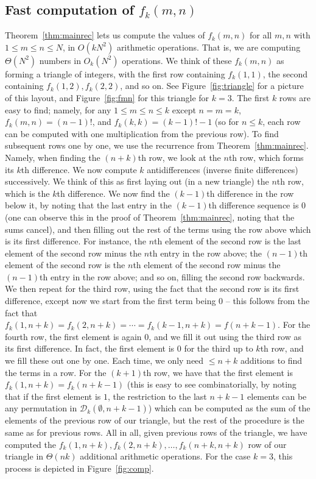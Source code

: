 \documentclass{amsart}
\theoremstyle{definition}
\begin{document}
\subsection{Fast computation of $f_k(m,n)$}\label{subsec:fast}
Theorem~\ref{thm:mainrec} lets us compute the values of $f_k(m,n)$ for all $m,n$ with $1\leq m\leq n\leq N$, in $O(k N^2)$ arithmetic operations. That is, we are computing $\Theta(N^2)$ numbers in $O_k(N^2)$ operations. We think of these $f_k(m,n)$ as forming a triangle of integers, with the first row containing $f_k(1,1)$, the second containing $f_k(1,2), f_k(2,2)$, and so on. See Figure~\ref{fig:triangle} for a picture of this layout, and Figure~\ref{fig:fmn} for this triangle for $k=3$. The first $k$ rows are easy to find; namely, for any $1\leq m\leq n\leq k$ except $n=m=k$, $f_k(m,n)=(n-1)!$, and $f_k(k,k)=(k-1)!-1$ (so for $n\leq k$, each row can be computed with one multiplication from the previous row). To find subsequent rows one by one, we use the recurrence from Theorem~\ref{thm:mainrec}. Namely, when finding the $(n+k)$th row, we look at the $n$th row, which forms its $k$th difference. We now compute $k$ antidifferences (inverse finite differences) successively. We think of this as first laying out (in a new triangle) the $n$th row, which is the $k$th difference. We now find the $(k-1)$th difference in the row below it, by noting that the last entry in the $(k-1)$th difference sequence is $0$ (one can observe this in the proof of Theorem~\ref{thm:mainrec}, noting that the sums cancel), and then filling out the rest of the terms using the row above which is its first difference. For instance, the $n$th element of the second row is the last element of the second row minus the $n$th entry in the row above; the $(n-1)$th element of the second row is the $n$th element of the second row minus the $(n-1)$th entry in the row above; and so on, filling the second row backwards. We then repeat for the third row, using the fact that the second row is its first difference, except now we start from the first term being $0$ -- this follows from the fact that $f_k(1,n+k)=f_k(2,n+k)=\cdots=f_k(k-1,n+k)=f(n+k-1)$. For the fourth row, the first element is again $0$, and we fill it out using the third row as its first difference. In fact, the first element is $0$ for the third up to $k$th row, and we fill these out one by one. Each time, we only need $\leq n+k$ additions to find the terms in a row. For the $(k+1)$th row, we have that the first element is $f_k(1,n+k)=f_k(n+k-1)$ (this is easy to see combinatorially, by noting that if the first element is $1$, the restriction to the last $n+k-1$ elements can be any permutation in $\mathcal{D}_k(\emptyset,n+k-1)$) which can be computed as the sum of the elements of the previous row of our triangle, but the rest of the procedure is the same as for previous rows. All in all, given previous rows of the triangle, we have computed the $f_k(1,n+k),f_k(2,n+k),\ldots, f_k(n+k,n+k)$ row of our triangle in $\Theta(nk)$ additional arithmetic operations. For the case $k=3$, this process is depicted in Figure~\ref{fig:comp}. 
\end{document}
